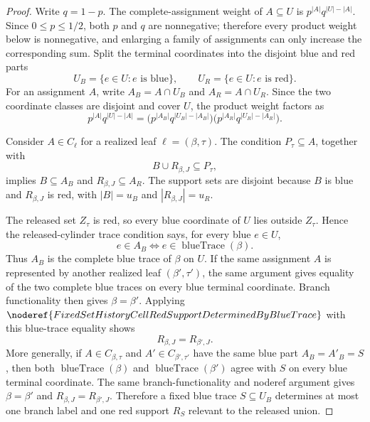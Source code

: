 \begin{proof}
Write \(q=1-p\).  The complete-assignment weight of
\(A\subseteq U\) is \(p^{|A|}q^{|U|-|A|}\).  Since \(0\le p\le 1/2\), both
\(p\) and \(q\) are nonnegative; therefore every product weight below is
nonnegative, and enlarging a family of assignments can only increase the
corresponding sum.  Split the terminal coordinates into the disjoint blue and
red parts
\[
U_B=\{e\in U:e\text{ is blue}\},\qquad
U_R=\{e\in U:e\text{ is red}\}.
\]
For an assignment \(A\), write \(A_B=A\cap U_B\) and \(A_R=A\cap U_R\).  Since
the two coordinate classes are disjoint and cover \(U\), the product weight
factors as
\[
p^{|A|}q^{|U|-|A|}
=\bigl(p^{|A_B|}q^{|U_B|-|A_B|}\bigr)
 \bigl(p^{|A_R|}q^{|U_R|-|A_R|}\bigr).
\]

Consider \(A\in C_\ell\) for a realized leaf \(\ell=(\beta,\tau)\).  The
condition \(P_\tau\subseteq A\), together with
\[
B\cup R_{\beta,J}\subseteq P_\tau,
\]
implies \(B\subseteq A_B\) and \(R_{\beta,J}\subseteq A_R\).  The support
sets are disjoint because \(B\) is blue and \(R_{\beta,J}\) is red, with
\(|B|=u_B\) and \(|R_{\beta,J}|=u_R\).

The released set \(Z_\tau\) is red, so every blue coordinate of \(U\) lies
outside \(Z_\tau\).  Hence the released-cylinder trace condition says, for
every blue \(e\in U\),
\[
e\in A_B\Longleftrightarrow e\in\operatorname{blueTrace}(\beta).
\]
Thus \(A_B\) is the complete blue trace of \(\beta\) on \(U\).  If the same
assignment \(A\) is represented by another realized leaf
\((\beta',\tau')\), the same argument gives equality of the two complete blue
traces on every blue terminal coordinate.  Branch functionality then gives
\(\beta=\beta'\).  Applying
\(\noderef{FixedSetHistoryCellRedSupportDeterminedByBlueTrace}\) with this
blue-trace equality shows
\[
R_{\beta,J}=R_{\beta',J}.
\]
More generally, if \(A\in C_{\beta,\tau}\) and \(A'\in C_{\beta',\tau'}\) have
the same blue part \(A_B=A'_B=S\), then both
\(\operatorname{blueTrace}(\beta)\) and
\(\operatorname{blueTrace}(\beta')\) agree with \(S\) on every blue terminal
coordinate.  The same branch-functionality and noderef argument gives
\(\beta=\beta'\) and \(R_{\beta,J}=R_{\beta',J}\).  Therefore a fixed blue
trace \(S\subseteq U_B\) determines at most one branch label and one red
support \(R_S\) relevant to the released union.


\end{proof}
